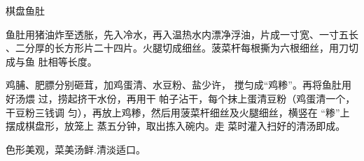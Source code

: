 \begin{recipe}{棋盘鱼肚}

\ingredients


\preparation

\step 鱼肚用猪油炸至透胀，先入冷水，再入温热水内漂净浮油，片成一寸宽、一寸五长
、二分厚的长方形片二十四片。火腿切成细丝。菠菜杆每根撕为六根细丝，用刀切成与鱼
肚相等长度。

鸡脯、肥膘分别砸茸，加鸡蛋清、水豆粉、盐少许， 搅匀成“鸡糁”。再将鱼肚用好汤煨
过，捞起挤干水份，再用干 帕子沾干，每个抹上蛋清豆粉（鸡蛋清一个，干豆粉三钱调
匀），再放上鸡糁，然后用菠菜杆细丝及火腿细丝，横竖在 “糁”上摆成棋盘形，放笼上
蒸五分钟，取出拣入碗内。走 菜时灌入扫好的清汤即成。

\features

色形美观，菜美汤鲜.清淡适口。

\end{recipe}

